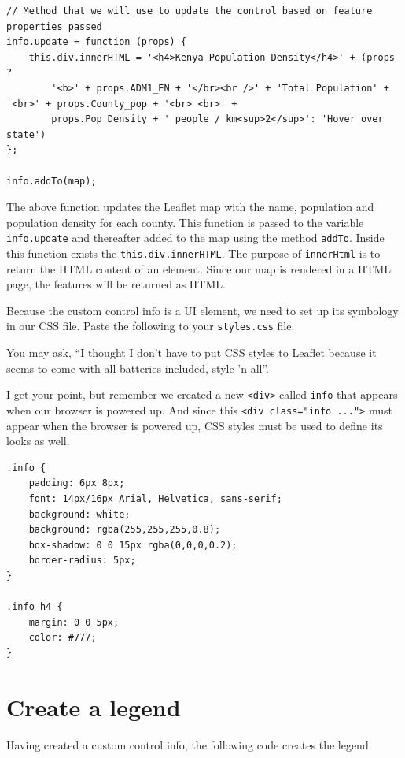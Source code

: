 \documentclass[
]{book}
\begin{document}
\begin{verbatim}
// Method that we will use to update the control based on feature properties passed
info.update = function (props) {
    this.div.innerHTML = '<h4>Kenya Population Density</h4>' + (props ? 
        '<b>' + props.ADM1_EN + '</br><br />' + 'Total Population' + '<br>' + props.County_pop + '<br> <br>' + 
        props.Pop_Density + ' people / km<sup>2</sup>': 'Hover over state')
};

info.addTo(map);
\end{verbatim}

The above function updates the Leaflet map with the name, population and population density for each county. This function is passed to the variable \texttt{info.update} and thereafter added to the map using the method \texttt{addTo}. Inside this function exists the \texttt{this.div.innerHTML}. The purpose of \texttt{innerHtml} is to return the HTML content of an element. Since our map is rendered in a HTML page, the features will be returned as HTML.

Because the custom control info is a UI element, we need to set up its symbology in our CSS file. Paste the following to your \texttt{styles.css} file.

You may ask, ``I thought I don't have to put CSS styles to Leaflet because it seems to come with all batteries included, style 'n all''.

I get your point, but remember we created a new \texttt{\textless{}div\textgreater{}} called \texttt{info} that appears when our browser is powered up. And since this \texttt{\textless{}div\ class="info\ ..."\textgreater{}} must appear when the browser is powered up, CSS styles must be used to define its looks as well.

\begin{verbatim}
.info {
    padding: 6px 8px;
    font: 14px/16px Arial, Helvetica, sans-serif;
    background: white;
    background: rgba(255,255,255,0.8);
    box-shadow: 0 0 15px rgba(0,0,0,0.2);
    border-radius: 5px;
}

.info h4 {
    margin: 0 0 5px;
    color: #777;
}
\end{verbatim}

\hypertarget{create-a-legend}{%
\section{Create a legend}\label{create-a-legend}}

Having created a custom control info, the following code creates the legend.
\end{document}
